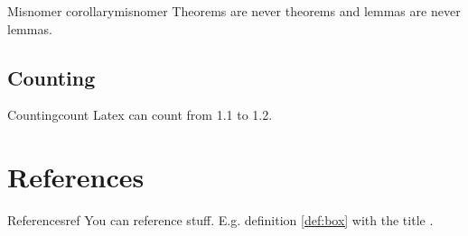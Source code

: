 \begin{theorem}{Misnomer corollary}{misnomer}
  Theorems are never theorems and lemmas are never lemmas.
\end{theorem}

\subsection{Counting}

\begin{axiom}{Counting}{count}
  Latex can count from 1.1 to 1.2.
\end{axiom}

\section{References}

\begin{corollary}{References}{ref}
  You can reference stuff. E.g. definition \ref{def:box} with the title .
\end{corollary}


